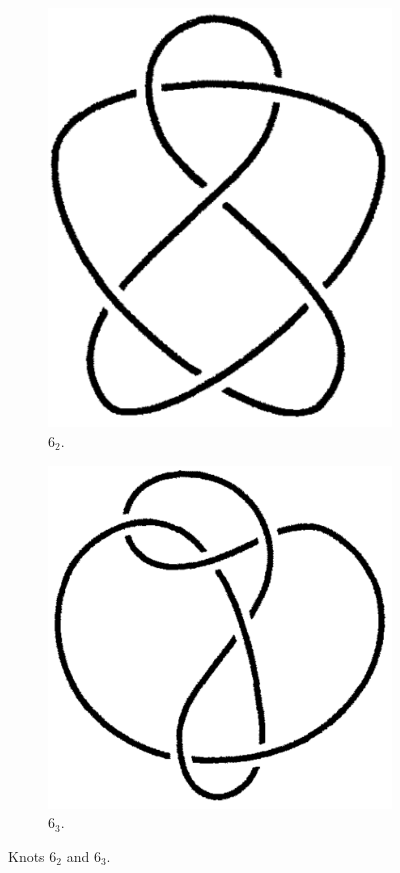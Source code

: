 \documentclass[titlepage]{article}
\numberwithin{figure}{section}
\numberwithin{table}{section}
\numberwithin{equation}{section}
\begin{document}
\begin{itemize}
\begin{figure}[h!]
\begin{subfigure}[b]{0.2\linewidth}
            \centering
            \includegraphics[width=0.8\linewidth]{Blender/ex2-3a.png}
            \caption{$6_2$.}
            \label{fig:ex2-3a}
        \end{subfigure}
        \begin{subfigure}[b]{0.2\linewidth}
            \centering
            \includegraphics[width=0.7\linewidth]{Blender/ex2-3b.png}
            \caption{$6_3$.}
            \label{fig:ex2-3b}
        \end{subfigure}
        \caption{Knots $6_2$ and $6_3$.}

\end{figure}
\end{itemize}
\end{document}
